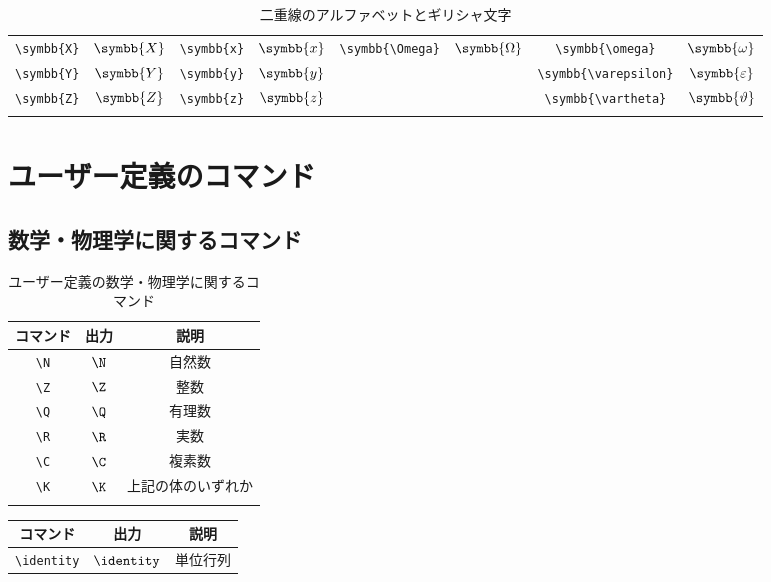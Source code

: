 \begin{longtable}{cccccccc}
    \verb|\symbb{X}| & \(\symbb{X}\) & \verb|\symbb{x}| & \(\symbb{x}\) & \verb|\symbb{\Omega}|   & \(\symbb{\Omega}\)   & \verb|\symbb{\omega}|      & \(\symbb{\omega}\)      \\
    \verb|\symbb{Y}| & \(\symbb{Y}\) & \verb|\symbb{y}| & \(\symbb{y}\) &                         &                      & \verb|\symbb{\varepsilon}| & \(\symbb{\varepsilon}\) \\
    \verb|\symbb{Z}| & \(\symbb{Z}\) & \verb|\symbb{z}| & \(\symbb{z}\) &                         &                      & \verb|\symbb{\vartheta}|   & \(\symbb{\vartheta}\)   \\
    \bottomrule
    \caption{二重線のアルファベットとギリシャ文字}
    \label{tab:double_letters}
\end{longtable}

\section{ユーザー定義のコマンド}

\subsection{数学・物理学に関するコマンド}

\begin{longtable}{ccc}
    \toprule
    コマンド  & 出力   & 説明               \\
    \midrule
    \verb|\N| & \(\N\) & 自然数             \\
    \verb|\Z| & \(\Z\) & 整数               \\
    \verb|\Q| & \(\Q\) & 有理数             \\
    \verb|\R| & \(\R\) & 実数               \\
    \verb|\C| & \(\C\) & 複素数             \\
    \verb|\K| & \(\K\) & 上記の体のいずれか \\
    \bottomrule
    \caption{ユーザー定義の数学・物理学に関するコマンド}
    \label{tab:user_defined_math_physics_commands}
\end{longtable}

\begin{longtable}{ccc}
    \toprule
    コマンド         & 出力          & 説明     \\
    \midrule
    \verb|\identity| & \(\identity\) & 単位行列 \\
    \bottomrule
\end{longtable}


